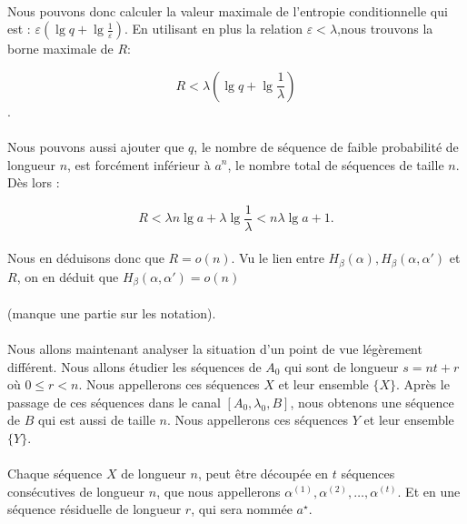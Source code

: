 	\paragraph{}
	Nous pouvons donc calculer la valeur maximale de l'entropie conditionnelle
	qui est : $\varepsilon \left(\lg q+\lg\frac{1}{\varepsilon}\right)$.
	En utilisant en plus la relation $\varepsilon < \lambda$,nous trouvons la
	 borne maximale de $R$:
	
	\[R<\lambda\left(\lg q+\lg\frac{1}{\lambda}\right)\].
	
	\paragraph{}
	Nous pouvons aussi ajouter que $q$, le nombre de séquence de faible 
	probabilité de longueur $n$, est forcément inférieur à $a^n$, le 
	nombre total de séquences de taille $n$.
	Dès lors :
	
	\[R<\lambda n\lg a +\lambda \lg \frac{1}{\lambda}<n\lambda\lg a+1.\]
	
	\paragraph{}
	Nous en déduisons donc que $R=o(n)$. Vu le lien entre 
	$H_\beta(\alpha),H_\beta(\alpha,\alpha')$ et $R$, 
	on en déduit que $H_\beta(\alpha,\alpha')=o(n)$
	
	\paragraph{}
	(manque une partie sur les notation).
	
	\paragraph{}
	Nous allons maintenant analyser la situation d'un point de vue 
	légèrement différent. Nous allons étudier les séquences de $A_0$ qui sont
	de longueur $s = nt+r$ où $0\le r < n$. Nous appellerons ces séquences 
	$X$ et leur ensemble $\{X\}$. Après le passage de ces séquences dans le 
	canal $[A_0,\lambda_0,B]$, nous obtenons une séquence de $B$ qui est aussi
	de taille $n$. Nous appellerons ces séquences $Y$ et 
	leur ensemble $\{Y\}$.
	
	\paragraph{}
	Chaque séquence $X$ de longueur $n$, peut être découpée en $t$ séquences 
	consécutives de longueur $n$, que nous appellerons 
	$\alpha^{(1)}, \alpha^{(2)}, \dots, \alpha^{(t)}$.
	Et en une séquence résiduelle de longueur $r$, qui sera nommée $a^\star$.
	
